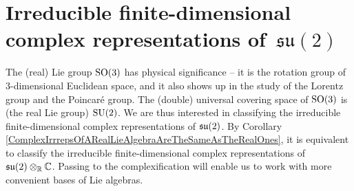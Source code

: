 

\section{Irreducible finite-dimensional complex representations of \,$\mathfrak{su}(2)$}
\setcounter{theorem}{0}
\setcounter{equation}{0}


\renewcommand{\theenumi}{\roman{enumi}}
\renewcommand{\labelenumi}{\textnormal{(\theenumi)}$\;\;$}


\vskip 0.3cm
\begin{remark}
\mbox{}
\vskip 0.1cm
\noindent
The (real) Lie group $\textnormal{SO}(3)$ has physical significance --
it is the rotation group of $3$-dimensional Euclidean space, and
it also shows up in the study of the Lorentz group and the Poincaré group.
The (double) universal covering space of $\textnormal{SO}(3)$ is (the real Lie group) $\textnormal{SU}(2)$.
We are thus interested in classifying the irreducible finite-dimensional complex representations of $\mathfrak{su}(2)$.
By Corollary \ref{ComplexIrrrepsOfARealLieAlgebraAreTheSameAsTheRealOnes},
it is equivalent to classify the irreducible finite-dimensional complex representations of $\mathfrak{su}(2) \otimes_{\mathbb{R}} \mathbb{C}$.
Passing to the complexification will enable us to work with more convenient bases of Lie algebras.
\end{remark}



